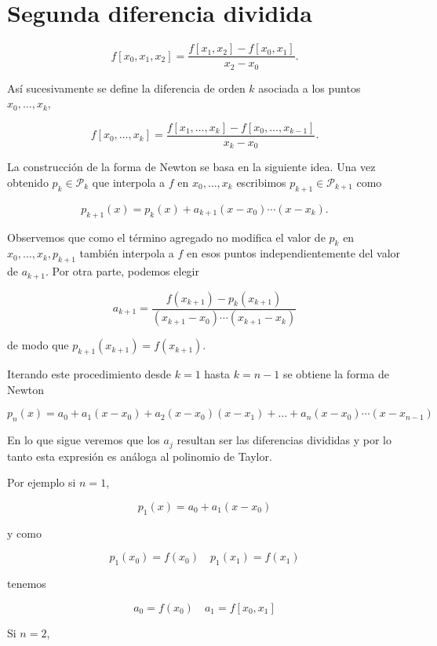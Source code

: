 \documentclass[10pt]{article}
\begin{document}
\section*{Segunda diferencia dividida}
$$
f\left[x_{0}, x_{1}, x_{2}\right]=\frac{f\left[x_{1}, x_{2}\right]-f\left[x_{0}, x_{1}\right]}{x_{2}-x_{0}} .
$$

Así sucesivamente se define la diferencia de orden $k$ asociada a los puntos $x_{0}, \ldots, x_{k}$,

$$
f\left[x_{0}, \ldots, x_{k}\right]=\frac{f\left[x_{1}, \ldots, x_{k}\right]-f\left[x_{0}, \ldots, x_{k-1}\right]}{x_{k}-x_{0}} .
$$

La construcción de la forma de Newton se basa en la siguiente idea. Una vez obtenido $p_{k} \in \mathcal{P}_{k}$ que interpola a $f$ en $x_{0}, \ldots, x_{k}$ escribimos $p_{k+1} \in \mathcal{P}_{k+1}$ como

$$
p_{k+1}(x)=p_{k}(x)+a_{k+1}\left(x-x_{0}\right) \cdots\left(x-x_{k}\right) .
$$

Observemos que como el término agregado no modifica el valor de $p_{k}$ en $x_{0}, \ldots, x_{k}, p_{k+1}$ también interpola a $f$ en esos puntos independientemente del valor de $a_{k+1}$. Por otra parte, podemos elegir

$$
a_{k+1}=\frac{f\left(x_{k+1}\right)-p_{k}\left(x_{k+1}\right)}{\left(x_{k+1}-x_{0}\right) \cdots\left(x_{k+1}-x_{k}\right)}
$$

de modo que $p_{k+1}\left(x_{k+1}\right)=f\left(x_{k+1}\right)$.

Iterando este procedimiento desde $k=1$ hasta $k=n-1$ se obtiene la forma de Newton

$$
p_{n}(x)=a_{0}+a_{1}\left(x-x_{0}\right)+a_{2}\left(x-x_{0}\right)\left(x-x_{1}\right)+\ldots+a_{n}\left(x-x_{0}\right) \cdots\left(x-x_{n-1}\right)
$$

En lo que sigue veremos que los $a_{j}$ resultan ser las diferencias divididas y por lo tanto esta expresión es análoga al polinomio de Taylor.

Por ejemplo si $n=1$,

$$
p_{1}(x)=a_{0}+a_{1}\left(x-x_{0}\right)
$$

y como

$$
p_{1}\left(x_{0}\right)=f\left(x_{0}\right) \quad p_{1}\left(x_{1}\right)=f\left(x_{1}\right)
$$

tenemos

$$
a_{0}=f\left(x_{0}\right) \quad a_{1}=f\left[x_{0}, x_{1}\right]
$$

Si $n=2$,
\end{document}
